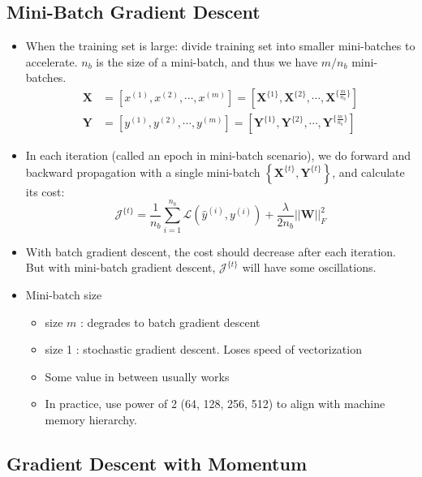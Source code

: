 \subsection{Mini-Batch Gradient Descent}
\begin{itemize}
\item When the training set is large: divide training set into smaller mini-batches to accelerate. $n_b$ is the size of a mini-batch, and thus we have $m/{n_b}$ mini-batches.
\begin{align*}
  \mathbf{X}&=\left[x^{(1)}, x^{(2)}, \cdots, x^{(m)}\right]=\left[\mathbf{X}^{\{1\}}, \mathbf{X}^{\{2\}}, \cdots, \mathbf{X}^{\{\frac{m}{n_b}\}}\right]\\
  \mathbf{Y}&=\left[y^{(1)}, y^{(2)}, \cdots, y^{(m)}\right]=\left[\mathbf{Y}^{\{1\}}, \mathbf{Y}^{\{2\}}, \cdots, \mathbf{Y}^{\{\frac{m}{n_b}\}}\right]
\end{align*}
\item In each iteration (called an epoch in mini-batch scenario), we do forward and backward propagation with a single mini-batch $\left\{\mathbf{X}^{\{t\}}, \mathbf{Y}^{\{t\}}\right\}$, and calculate its cost:
\[\mathcal{J}^{\{t\}}=\frac{1}{n_b}\displaystyle\sum_{i=1}^{n_b}\mathcal{L}\left(\hat{y}^{(i)},y^{(i)}\right)+\frac{\lambda}{2n_b}\vert\vert\mathbf{W}\vert\vert^2_F\]
\item With batch gradient descent, the cost should decrease after each iteration. But with mini-batch gradient descent, $\mathcal{J}^{\{t\}}$ will have some oscillations.
\item Mini-batch size
  \begin{itemize}
    \item size $m$ : degrades to batch gradient descent
    \item size 1 : stochastic gradient descent. Loses speed of vectorization
    \item Some value in between usually works
    \item In practice, use power of 2 (64, 128, 256, 512) to align with machine memory hierarchy.
  \end{itemize}
\end{itemize}
\subsection{Gradient Descent with Momentum}
